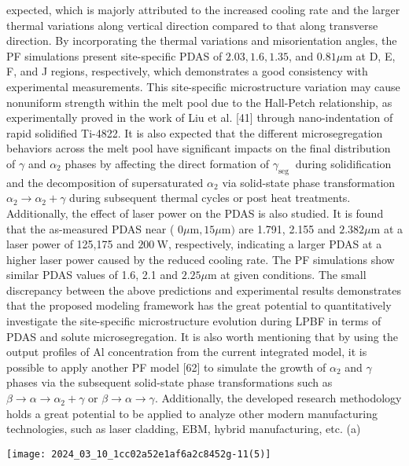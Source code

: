 \documentclass[10pt]{article}
\begin{document}
expected, which is majorly attributed to the increased cooling rate and the larger thermal variations along vertical direction compared to that along transverse direction. By incorporating the thermal variations and misorientation angles, the PF simulations present site-specific PDAS of $2.03,1.6,1.35$, and $0.81 \mu \mathrm{m}$ at D, E, F, and J regions, respectively, which demonstrates a good consistency with experimental measurements. This site-specific microstructure variation may cause nonuniform strength within the melt pool due to the Hall-Petch relationship, as experimentally proved in the work of Liu et al. [41] through nano-indentation of rapid solidified Ti-4822. It is also expected that the different microsegregation behaviors across the melt pool have significant impacts on the final distribution of $\gamma$ and $\alpha_{2}$ phases by affecting the direct formation of $\gamma_{\text {seg }}$ during solidification and the decomposition of supersaturated $\alpha_{2}$ via solid-state phase transformation $\alpha_{2} \rightarrow \alpha_{2}+\gamma$ during subsequent thermal cycles or post heat treatments. Additionally, the effect of laser power on the PDAS is also studied. It is found that the as-measured PDAS near ( $0 \mu \mathrm{m}, 15 \mu \mathrm{m})$ are 1.791, 2.155 and $2.382 \mu \mathrm{m}$ at a laser power of 125,175 and $200 \mathrm{~W}$, respectively, indicating a larger PDAS at a higher laser power caused by the reduced cooling rate. The PF simulations show similar PDAS values of 1.6, 2.1 and $2.25 \mu \mathrm{m}$ at given conditions. The small discrepancy between the above predictions and experimental results demonstrates that the proposed modeling framework has the great potential to quantitatively investigate the site-specific microstructure evolution during LPBF in terms of PDAS and solute microsegregation. It is also worth mentioning that by using the output profiles of $\mathrm{Al}$ concentration from the current integrated model, it is possible to apply another PF model [62] to simulate the growth of $\alpha_{2}$ and $\gamma$ phases via the subsequent solid-state phase transformations such as $\beta \rightarrow \alpha \rightarrow \alpha_{2}+\gamma$ or $\beta \rightarrow \alpha \rightarrow \gamma$. Additionally, the developed research methodology holds a great potential to be applied to analyze other modern manufacturing technologies, such as laser cladding, EBM, hybrid manufacturing, etc. (a)

\begin{center}
\texttt{[image: 2024\_03\_10\_1cc02a52e1af6a2c8452g-11(5)]}
\end{center}
\end{document}
